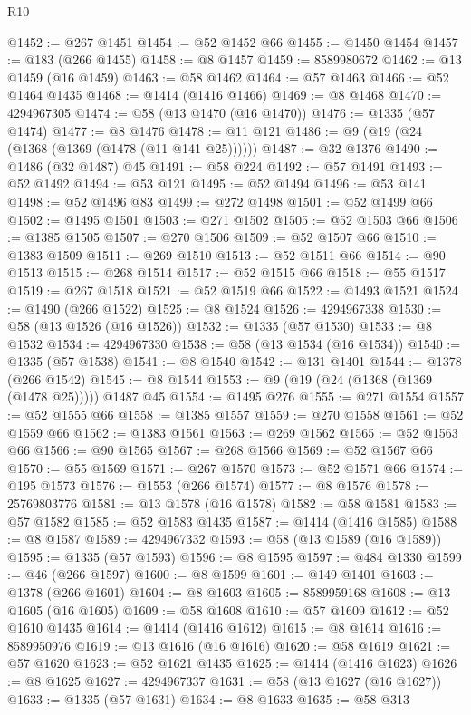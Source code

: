 \begin{lexlean}{R10}
\begin{coremodule}
@1452 := @267 @1451
@1454 := @52 @1452 @66
@1455 := @1450 @1454
@1457 := @183 (@266 @1455)
@1458 := @8 @1457
@1459 := 8589980672
@1462 := @13 @1459 (@16 @1459)
@1463 := @58 @1462
@1464 := @57 @1463
@1466 := @52 @1464 @1435
@1468 := @1414 (@1416 @1466)
@1469 := @8 @1468
@1470 := 4294967305
@1474 := @58 (@13 @1470 (@16 @1470))
@1476 := @1335 (@57 @1474)
@1477 := @8 @1476
@1478 := @11 @121
@1486 := @9 (@19 (@24 (@1368 (@1369 (@1478 (@11 @141 @25))))))
@1487 := @32 @1376
@1490 := @1486 (@32 @1487) @45
@1491 := @58 @224
@1492 := @57 @1491
@1493 := @52 @1492
@1494 := @53 @121
@1495 := @52 @1494
@1496 := @53 @141
@1498 := @52 @1496 @83
@1499 := @272 @1498
@1501 := @52 @1499 @66
@1502 := @1495 @1501
@1503 := @271 @1502
@1505 := @52 @1503 @66
@1506 := @1385 @1505
@1507 := @270 @1506
@1509 := @52 @1507 @66
@1510 := @1383 @1509
@1511 := @269 @1510
@1513 := @52 @1511 @66
@1514 := @90 @1513
@1515 := @268 @1514
@1517 := @52 @1515 @66
@1518 := @55 @1517
@1519 := @267 @1518
@1521 := @52 @1519 @66
@1522 := @1493 @1521
@1524 := @1490 (@266 @1522)
@1525 := @8 @1524
@1526 := 4294967338
@1530 := @58 (@13 @1526 (@16 @1526))
@1532 := @1335 (@57 @1530)
@1533 := @8 @1532
@1534 := 4294967330
@1538 := @58 (@13 @1534 (@16 @1534))
@1540 := @1335 (@57 @1538)
@1541 := @8 @1540
@1542 := @131 @1401
@1544 := @1378 (@266 @1542)
@1545 := @8 @1544
@1553 := @9 (@19 (@24 (@1368 (@1369 (@1478 @25))))) @1487 @45
@1554 := @1495 @276
@1555 := @271 @1554
@1557 := @52 @1555 @66
@1558 := @1385 @1557
@1559 := @270 @1558
@1561 := @52 @1559 @66
@1562 := @1383 @1561
@1563 := @269 @1562
@1565 := @52 @1563 @66
@1566 := @90 @1565
@1567 := @268 @1566
@1569 := @52 @1567 @66
@1570 := @55 @1569
@1571 := @267 @1570
@1573 := @52 @1571 @66
@1574 := @195 @1573
@1576 := @1553 (@266 @1574)
@1577 := @8 @1576
@1578 := 25769803776
@1581 := @13 @1578 (@16 @1578)
@1582 := @58 @1581
@1583 := @57 @1582
@1585 := @52 @1583 @1435
@1587 := @1414 (@1416 @1585)
@1588 := @8 @1587
@1589 := 4294967332
@1593 := @58 (@13 @1589 (@16 @1589))
@1595 := @1335 (@57 @1593)
@1596 := @8 @1595
@1597 := @484 @1330
@1599 := @46 (@266 @1597)
@1600 := @8 @1599
@1601 := @149 @1401
@1603 := @1378 (@266 @1601)
@1604 := @8 @1603
@1605 := 8589959168
@1608 := @13 @1605 (@16 @1605)
@1609 := @58 @1608
@1610 := @57 @1609
@1612 := @52 @1610 @1435
@1614 := @1414 (@1416 @1612)
@1615 := @8 @1614
@1616 := 8589950976
@1619 := @13 @1616 (@16 @1616)
@1620 := @58 @1619
@1621 := @57 @1620
@1623 := @52 @1621 @1435
@1625 := @1414 (@1416 @1623)
@1626 := @8 @1625
@1627 := 4294967337
@1631 := @58 (@13 @1627 (@16 @1627))
@1633 := @1335 (@57 @1631)
@1634 := @8 @1633
@1635 := @58 @313

\end{coremodule}
\end{lexlean}
